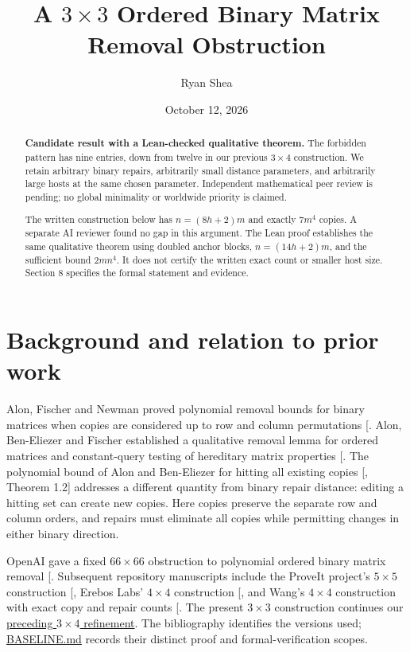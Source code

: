 \documentclass[11pt,letterpaper]{article}
\title{A \(3\times 3\) Ordered Binary Matrix Removal Obstruction}
\author{Ryan Shea}
\date{October 12, 2026}
\begin{document}
\maketitle
\begin{abstract}

\textbf{Candidate result with a Lean-checked qualitative theorem.} The
forbidden pattern has nine entries, down from twelve in our previous
\(3\times 4\) construction. We retain arbitrary binary repairs,
arbitrarily small distance parameters, and arbitrarily large hosts at
the same chosen parameter. Independent mathematical peer review is
pending; no global minimality or worldwide priority is claimed.

The written construction below has \(n=(8h+2)m\) and exactly \(7m^{4}\)
copies. A separate AI reviewer found no gap in this argument. The Lean
proof establishes the same qualitative theorem using doubled anchor
blocks, \(n=(14h+2)m\), and the sufficient bound \(2mn^{4}\). It does
not certify the written exact count or smaller host size. Section 8
specifies the formal statement and evidence.

\end{abstract}

\section*{Background and relation to prior
work}\label{background-and-relation-to-prior-work}

Alon, Fischer and Newman proved polynomial removal bounds for binary
matrices when copies are considered up to row and column permutations
{[}\citeproc{ref-alon-fischer-newman2007}{1}{]}. Alon, Ben-Eliezer and
Fischer established a qualitative removal lemma for ordered matrices and
constant-query testing of hereditary matrix properties
{[}\citeproc{ref-alon-ben-eliezer-fischer2017}{2}{]}. The polynomial
bound of Alon and Ben-Eliezer for hitting all existing copies
{[}, Theorem 1.2{]} addresses a
different quantity from binary repair distance: editing a hitting set
can create new copies. Here copies preserve the separate row and column
orders, and repairs must eliminate all copies while permitting changes
in either binary direction.

OpenAI gave a fixed \(66\times 66\) obstruction to polynomial ordered
binary matrix removal {[}\citeproc{ref-openai2026}{4}{]}. Subsequent
repository manuscripts include the ProveIt project's \(5\times 5\)
construction {[}\citeproc{ref-proveit2026}{5}{]}, Erebos Labs'
\(4\times 4\) construction {[}\citeproc{ref-erebos2026}{6}{]}, and
Wang's \(4\times 4\) construction with exact copy and repair counts
{[}\citeproc{ref-wang2026}{7}{]}. The present \(3\times 3\) construction
continues our
\href{https://github.com/shea256/ordered-binary-matrix-removal/blob/master/proofs/three-by-four.md}{preceding
\(3\times 4\) refinement}. The bibliography identifies the versions
used;
\href{https://github.com/shea256/ordered-binary-matrix-removal/blob/master/BASELINE.md}{BASELINE.md}
records their distinct proof and formal-verification scopes.
\end{document}

